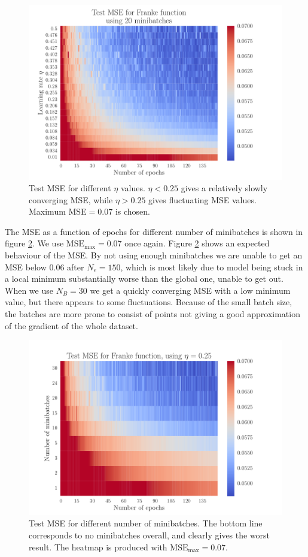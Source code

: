 \documentclass[12pt]{extarticle}
\begin{document}
\begin{figure}[h!]
	\includegraphics[width=0.9\linewidth]{SGD_Franke/reg_Franke__epochs_eta__Test_MSE__262224.pdf}
	\caption{Test MSE for different $\eta$ values. $\eta<0.25$ gives a relatively slowly converging MSE, while $\eta>0.25$ gives fluctuating MSE values. Maximum MSE$=0.07$ is chosen.}
	\label{fig:SGD_Franke_epochs_eta}
\end{figure}

The MSE as a function of epochs for different number of minibatches is shown in figure \ref{fig:SGD_Franke_epochs_minibatches}. We use $\mathrm{MSE}_\mathrm{max}=0.07$ once again.
Figure \ref{fig:SGD_Franke_epochs_minibatches} shows an expected behaviour of the MSE. By not using enough minibatches we are unable to get an MSE below $0.06$ after $N_e=150$, which is most likely due to model being stuck in a local minimum substantially worse than the global one, unable to get out. When we use $N_B=30$ we get a quickly converging MSE with a low minimum value, but there appears to some fluctuations. Because of the small batch size, the batches are more prone to consist of points not giving a good approximation of the gradient of the whole dataset.

\begin{figure}[h!]
	\includegraphics[width=0.9\linewidth]{SGD_Franke/reg_Franke__epochs_minibatches__Test_MSE__440533.pdf}
	\caption{Test MSE for different number of minibatches. The bottom line corresponds to no minibatches overall, and clearly gives the worst result. The heatmap is produced with $\mathrm{MSE}_\mathrm{max}=0.07$.}
	\label{fig:SGD_Franke_epochs_minibatches}
\end{figure}
\end{document}
